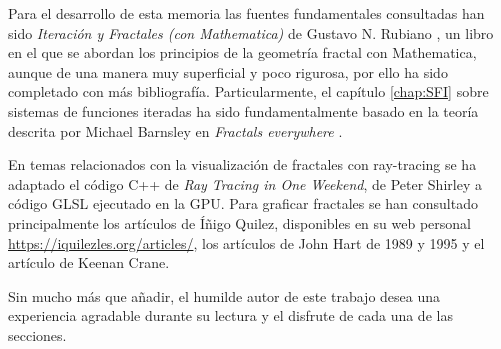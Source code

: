 Para el desarrollo de esta memoria las fuentes fundamentales consultadas han sido \textit{Iteración y Fractales (con Mathematica)} de Gustavo N. Rubiano \cite{rubiano}, un libro en el que se abordan los principios de la geometría fractal con Mathematica, aunque de una manera muy superficial y poco rigurosa, por ello ha sido completado con más bibliografía. Particularmente, el capítulo \ref{chap:SFI} sobre sistemas de funciones iteradas ha sido fundamentalmente basado en la teoría descrita por Michael Barnsley en \textit{Fractals everywhere} \cite{Barnsley}. 

En temas relacionados con la visualización de fractales con ray-tracing se ha adaptado el código C++ de \textit{Ray Tracing in One Weekend}, de Peter Shirley \cite{Shirley} a código GLSL ejecutado en la GPU. Para graficar fractales se han consultado principalmente los artículos de Íñigo Quilez, disponibles en su web personal \url{https://iquilezles.org/articles/}, los artículos de John Hart de 1989 \cite{Hart-1989} y 1995 \cite{Hart-1995} y el artículo \cite{keenan-crane} de Keenan Crane. 

Sin mucho más que añadir, el humilde autor de este trabajo desea una experiencia agradable durante su lectura y el disfrute de cada una de las secciones.






